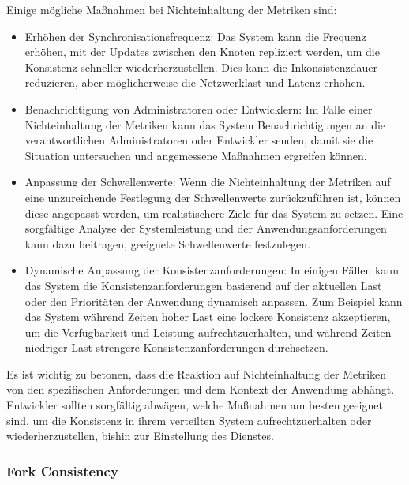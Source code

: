 \documentclass[../vs-script-first-v01.tex]{subfiles}
\begin{document}
Einige mögliche Maßnahmen bei Nichteinhaltung der Metriken sind:
\begin{itemize}
\item Erhöhen der Synchronisationsfrequenz: Das System kann die Frequenz erhöhen, mit der Updates zwischen den Knoten repliziert werden, um die Konsistenz schneller wiederherzustellen. Dies kann die Inkonsistenzdauer reduzieren, aber möglicherweise die Netzwerklast und Latenz erhöhen.
\item Benachrichtigung von Administratoren oder Entwicklern: Im Falle einer Nichteinhaltung der Metriken kann das System Benachrichtigungen an die verantwortlichen Administratoren oder Entwickler senden, damit sie die Situation untersuchen und angemessene Maßnahmen ergreifen können.
\item Anpassung der Schwellenwerte: Wenn die Nichteinhaltung der Metriken auf eine unzureichende Festlegung der Schwellenwerte zurückzuführen ist, können diese angepasst werden, um realistischere Ziele für das System zu setzen. Eine sorgfältige Analyse der Systemleistung und der Anwendungsanforderungen kann dazu beitragen, geeignete Schwellenwerte festzulegen.
\item Dynamische Anpassung der Konsistenzanforderungen: In einigen Fällen kann das System die Konsistenzanforderungen basierend auf der aktuellen Last oder den Prioritäten der Anwendung dynamisch anpassen. Zum Beispiel kann das System während Zeiten hoher Last eine lockere Konsistenz akzeptieren, um die Verfügbarkeit und Leistung aufrechtzuerhalten, und während Zeiten niedriger Last strengere Konsistenzanforderungen durchsetzen.
\end{itemize}
Es ist wichtig zu betonen, dass die Reaktion auf Nichteinhaltung der Metriken von den spezifischen Anforderungen und dem Kontext der Anwendung abhängt. Entwickler sollten sorgfältig abwägen, welche Maßnahmen am besten geeignet sind, um die Konsistenz in ihrem verteilten System aufrechtzuerhalten oder wiederherzustellen, bishin zur Einstellung des Dienstes. 




\subsubsection{Fork Consistency}
\end{document}
